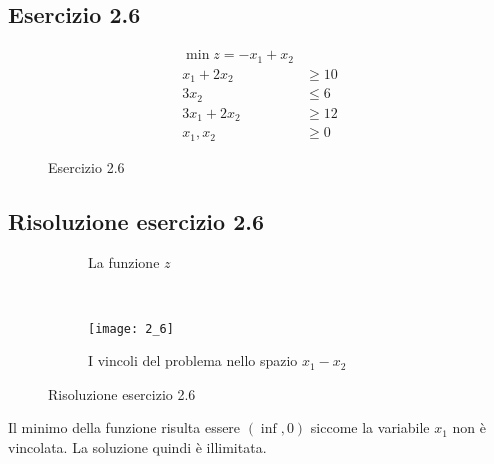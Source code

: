 \documentclass[\main/main.tex]{subfiles}
\begin{document}
\subsection{Esercizio 2.6}

\begin{figure}
  \begin{align*}
    \min z = -x_1 + x_2   \\
    x_1 + 2x_2  & \geq 10 \\
    3x_2        & \leq 6  \\
    3x_1 + 2x_2 & \geq 12 \\
    x_1, x_2    & \geq 0
  \end{align*}
  \caption{Esercizio 2.6}
\end{figure}

\subsection{Risoluzione esercizio 2.6}

\begin{figure}
  \begin{subfigure}{0.45\textwidth}
    \caption{La funzione $z$}
  \end{subfigure}
  ~
  \begin{subfigure}{0.45\textwidth}
    \texttt{[image: 2\_6]}
    \caption{I vincoli del problema nello spazio $x_1 - x_2$}
  \end{subfigure}
  \caption{Risoluzione esercizio 2.6}
\end{figure}

Il minimo della funzione risulta essere $(\inf, 0)$ siccome la variabile $x_1$ non è vincolata. La soluzione quindi è illimitata.
\end{document}
